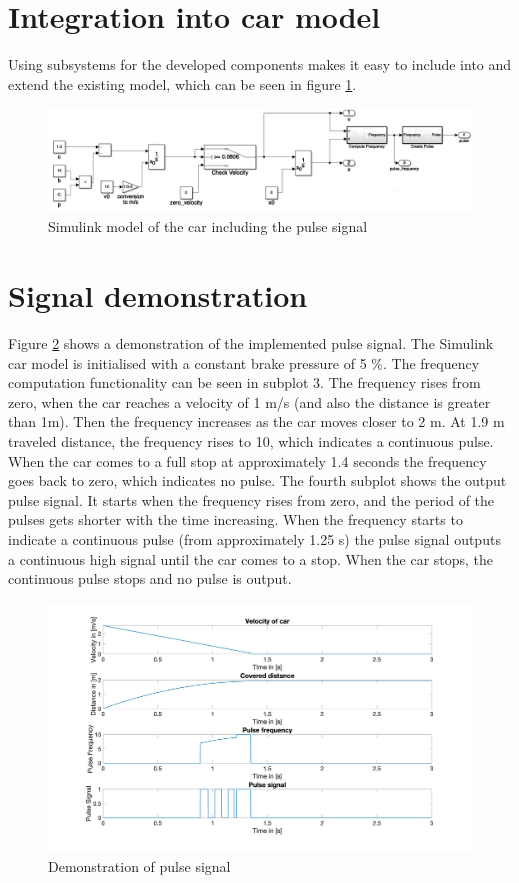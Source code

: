 \section{Integration into car model}\label{sec:D6Frequency}
Using subsystems for the developed components makes it easy to include into and extend the existing model, which can be seen in figure \ref{fig:D6_Integation}.
\begin{figure}[H]
\centering
\includegraphics[width=1\textwidth]{images/D6_integration.png}
\caption{Simulink model of the car including the pulse signal}
\label{fig:D6_Integation}
\end{figure}

\section{Signal demonstration}\label{sec:D6_SignalDemonstration}
Figure \ref{fig:D6_Result} shows a demonstration of the implemented pulse signal. The Simulink car model is initialised with a constant brake pressure of 5 \%. The frequency computation functionality can be seen in subplot 3. The frequency rises from zero, when the car reaches a velocity of 1 m/s (and also the distance is greater than 1m). Then the frequency increases as the car moves closer to 2 m. At 1.9 m traveled distance, the frequency rises to 10, which indicates a continuous pulse. When the car comes to a full stop at approximately 1.4 seconds the frequency goes back to zero, which indicates no pulse. The fourth subplot shows the output pulse signal. It starts when the frequency rises from zero, and the period of the pulses gets shorter with the time increasing. When the frequency starts to indicate a continuous pulse (from approximately 1.25 s) the pulse signal outputs a continuous high signal until the car comes to a stop. When the car stops, the continuous pulse stops and no pulse is output.

\begin{figure}[H]
\centering
\includegraphics[width=1\textwidth]{images/D6_result.jpg}
\caption{Demonstration of pulse signal}
\label{fig:D6_Result}
\end{figure}

